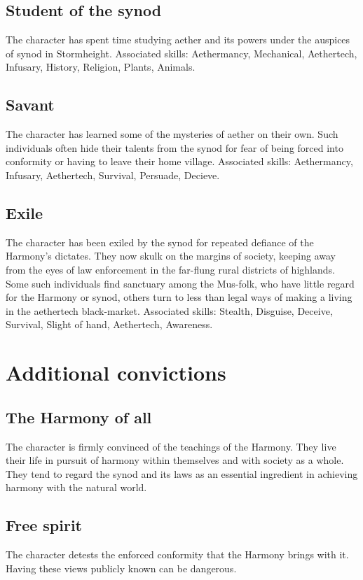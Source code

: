 \documentclass[a4paper,11pt,oneside]{book}
\begin{document}
\subsection{Student of the synod}
The character has spent time studying aether and its powers under the auspices of synod in Stormheight. Associated skills: Aethermancy, Mechanical, Aethertech, Infusary, History, Religion, Plants, Animals.

\subsection{Savant}
The character has learned some of the mysteries of aether on their own. Such individuals often hide their talents from the synod for fear of being forced into conformity or having to leave their home village. Associated skills: Aethermancy, Infusary, Aethertech, Survival, Persuade, Decieve. 

\subsection{Exile}
The character has been exiled by the synod for repeated defiance of the Harmony's dictates. They now skulk on the margins of society, keeping away from the eyes of law enforcement in the far-flung rural districts of highlands. Some such individuals find sanctuary among the Mus-folk, who have little regard for the Harmony or synod, others turn to less than legal ways of making a living in the aethertech black-market. Associated skills: Stealth, Disguise, Deceive, Survival, Slight of hand, Aethertech, Awareness.   


\section{Additional convictions}

\subsection{The Harmony of all}
The character is firmly convinced of the teachings of the Harmony. They live their life in pursuit of harmony within themselves and with society as a whole. They tend to regard the synod and its laws as an essential ingredient in achieving harmony with the natural world.

\subsection{Free spirit}
The character detests the enforced conformity that the Harmony brings with it. Having these views publicly known can be dangerous. 
\end{document}
